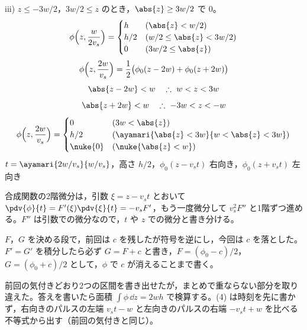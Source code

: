 iii) $z\le-3w/2$，$3w/2\le z$ のとき，$\abs{z}\ge3w/2$ で $0$。
\[ \phi\Bigl(z,\frac{w}{2v_s}\Bigr)=\begin{cases}h&(\abs{z}<w/2)\\ h/2&(w/2\le\abs{z}<3w/2)\\ 0&(3w/2\le\abs{z})\end{cases} \]
\[ \phi\Bigl(z,\frac{2w}{v_s}\Bigr)=\frac{1}{2}\bigl(\phi_0(z-2w)+\phi_0(z+2w)\bigr) \]
\[ \abs{z-2w}<w\quad\therefore\ w<z<3w \]
\[ \abs{z+2w}<w\quad\therefore\ -3w<z<-w \]
\[ \phi\Bigl(z,\frac{2w}{v_s}\Bigr)=\begin{cases}0&(3w<\abs{z})\\ h/2&(\ayamari{\abs{z}<3w}{w<\abs{z}<3w})\\ \nuke{0}&(\nuke{\abs{z}<w})\end{cases} \]
$t=\ayamari{2w/v_s}{w/v_s}$，高さ $h/2$，$\phi_0(z-v_st)$ 右向き，$\phi_0(z+v_st)$ 左向き
\item 合成関数の2階微分は，引数 $\xi=z-v_st$ とおいて $\pdv{\phi}{t}=F'(\xi)\pdv{\xi}{t}=-v_sF'$，もう一度微分して $v_s^{2}F''$ と1階ずつ進める。$F''$ は引数での微分なので，$t$ や $z$ での微分と書き分ける。
\item {} $F$，$G$ を決める段で，前回は $c$ を残したが符号を逆にし，今回は $c$ を落とした。$F'=G'$ を積分したら必ず $G=F+c$ と書き，$F=(\phi_0-c)/2$，$G=(\phi_0+c)/2$ として，$\phi$ で $c$ が消えることまで書く。
\item {} 前回の気付きどおり2つの区間を書き出せたが，まとめで重ならない部分を取り違えた。答えを書いたら面積 $\int\phi\,\dd z=2wh$ で検算する。(4) は時刻を先に書かず，右向きのパルスの左端 $v_st-w$ と左向きのパルスの右端 $-v_st+w$ を比べる不等式から出す（前回の気付きと同じ）。
